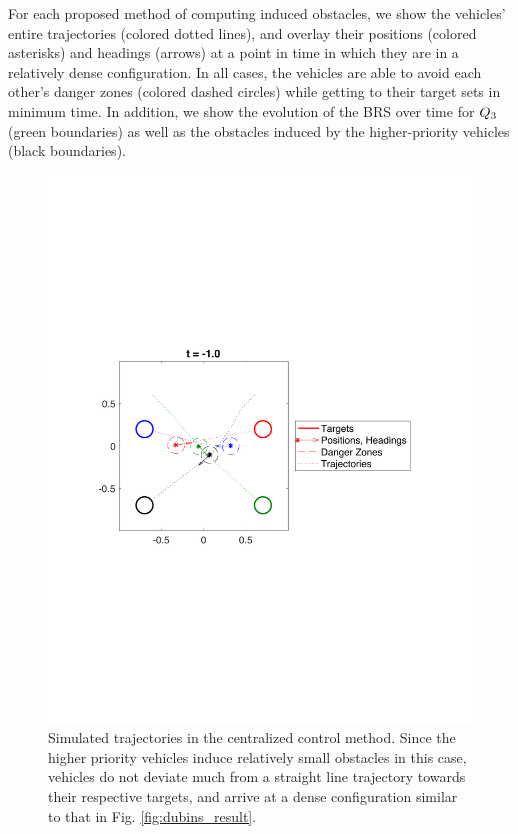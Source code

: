 For each proposed method of computing induced obstacles, we show the vehicles' entire trajectories (colored dotted lines), and overlay their positions (colored asterisks) and headings (arrows) at a point in time in which they are in a relatively dense configuration. In all cases, the vehicles are able to avoid each other's danger zones (colored dashed circles) while getting to their target sets in minimum time. In addition, we show the evolution of the BRS over time for $Q_3$ (green boundaries) as well as the obstacles induced by the higher-priority vehicles (black boundaries).

\begin{figure}[H]
  \centering
  \includegraphics[width=\columnwidth]{"fig/cc_traj"}
  \caption{Simulated trajectories in the centralized control method. Since the higher priority vehicles induce relatively small obstacles in this case, vehicles do not deviate much from a straight line trajectory towards their respective targets, and arrive at a dense configuration similar to that in Fig. \ref{fig:dubins_result}.}
  \label{fig:cc_traj}
\end{figure}

